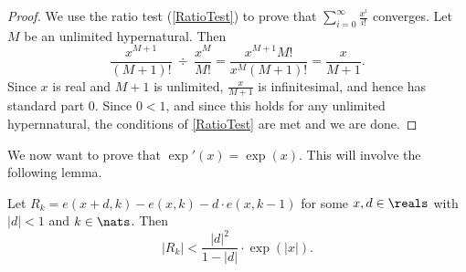 \begin{proof}
    We use the ratio test (\autoref{RatioTest}) to prove that $\sum_{i=0}^\infty \frac{x^i}{i!}$ converges. Let $M$ be an unlimited hypernatural. Then 
    \[
        \frac{x^{M+1}}{(M+1)!} \  \div \  \frac{x^M}{M!} = \frac{x^{M+1}M!}{x^M (M+1)!} 
        = \frac{x}{M+1}.
    \]
    Since $x$ is real and $M+1$ is unlimited, $\frac{x}{M+1}$ is infinitesimal, and hence has standard part $0$. Since $0 < 1$, and since this holds for any unlimited hypernnatural, the conditions of \autoref{RatioTest} are met and we are done.
\end{proof}

We now want to prove that $\exp'(x) = \exp(x)$. This will involve the following lemma.

\begin{lemma}\label{expRemainderLemma}
    Let $R_k = e(x+d, k) - e(x, k) - d \cdot e(x, k-1)$ for some $x, d \in \reals$ with $|d| < 1$ and $k \in \nats$. Then
    \[ |R_k| < \frac{|d|^2}{1-|d|} \cdot \exp(|x|). \]
\end{lemma}


